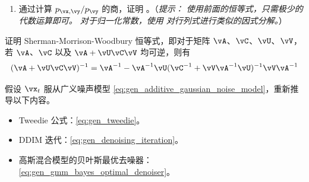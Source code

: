 \documentclass[../../book-main_zh.tex]{subfiles}
\begin{document}
\begin{exercise}
\begin{enumerate}
\begin{align}
            \end{align}
            其中 $\vm = (\vmu_{\vx} +
                \vSigma_{\vx\vy}\vSigma_{\vy}^{-1}(\vy
                - \vmu_{\vy})$。
            \item 通过计算 $p_{\vx, \vy} / p_{\vy}$ 的商，证明
                。（\textit{提示：
                        使用前面的恒等式，只需极少的代数运算即可。
                        对于归一化常数，使用
                        对行列式进行类似的因式分解。}）

        \end{enumerate}

    \end{exercise}

    \begin{exercise}\label{exercise:sherman_morrison_woodbury_identity}
        证明 Sherman-Morrison-Woodbury 恒等式，即对于矩阵
        \(\vA\)、\(\vC\)、\(\vU\)、\(\vV\)，若 \(\vA\)、\(\vC\) 以及
        \(\vA + \vU\vC\vV\) 均可逆，则有
        \begin{equation}
            (\vA + \vU\vC\vV)^{-1} = \vA^{-1} - \vA^{-1}\vU(\vC^{-1} +
            \vV\vA^{-1}\vU)^{-1}\vV\vA^{-1}
        \end{equation}
    \end{exercise}

    \begin{exercise}\label{exercise:generalizing_results_to_different_noise_models}
        假设 \(\vx_{t}\) 服从广义噪声模型 \eqref{eq:gen_additive_gaussian_noise_model}，重新推导以下内容。
        \begin{itemize}
            \item Tweedie 公式：\eqref{eq:gen_tweedie}。
            \item DDIM 迭代：\eqref{eq:gen_denoising_iteration}。
            \item 高斯混合模型的贝叶斯最优去噪器：
                \eqref{eq:gen_gmm_bayes_optimal_denoiser}。
        \end{itemize}
    \end{exercise}
\end{document}
